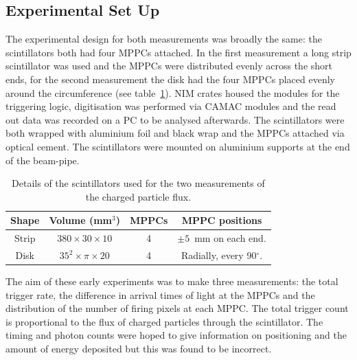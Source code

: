 \subsection{Experimental Set Up} %
\label{sec:experimental_set_up}
The experimental design for both measurements was broadly the same: the scintillators both had four MPPCs attached. In the first measurement a long strip scintillator was used and the MPPCs were distributed evenly across the short ends, for the second measurement the disk had the four MPPCs placed evenly around the circumference (see table~\ref{tab:charged_particle_flux_scint_details}). NIM crates housed the modules for the triggering logic, digitisation was performed via CAMAC modules and the read out data was recorded on a PC to be analysed afterwards. The scintillators were both wrapped with aluminium foil and black wrap and the MPPCs attached via optical cement. The scintillators were mounted on aluminium supports at the end of the beam-pipe.
\begin{table}[hptb]
  \begin{center}
    \begin{tabular}{c|c|c|c}
      Shape  &  Volume (mm\(^3\))           &  MPPCs  &  MPPC positions                    \\
      \hline
      Strip  &  \(380 \times30\times10\)    &  4      &  \( \pm 5 \)~mm on each end.       \\
      Disk   &  \( 35^2\times\pi\times20\)  &  4      &  Radially, every 90\( ^{\circ} \). \\
    \end{tabular}
  \end{center}
  \caption{Details of the scintillators used for the two measurements of the charged particle flux.}
  \label{tab:charged_particle_flux_scint_details}
\end{table}

The aim of these early experiments was to make three measurements: the total trigger rate, the difference in arrival times of light at the MPPCs and the distribution of the number of firing pixels at each MPPC. The total trigger count is proportional to the flux of charged particles through the scintillator. The timing and photon counts were hoped to give information on positioning and the amount of energy deposited but this was found to be incorrect.



